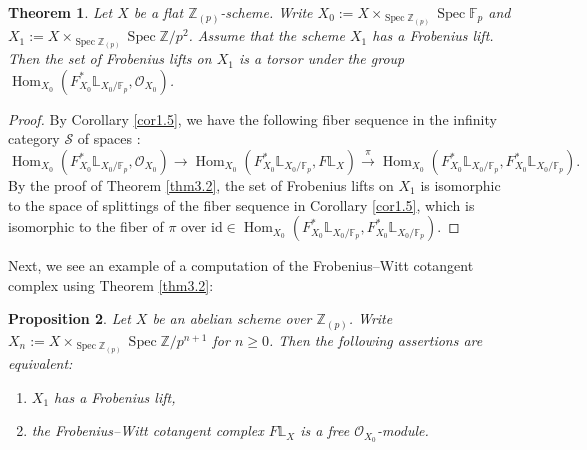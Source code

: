 \documentclass[11pt, a4paper]{amsart}
\theoremstyle{plain}
\newtheorem{theorem}{Theorem}[section]
\newtheorem{prop}[theorem]{Proposition}
\theoremstyle{definition}
\begin{document}
\begin{theorem}\label{thm3.3}
    Let $X$ be a flat $\mathbb Z_{(p)}$-scheme. Write $X_0:=X\times _{\operatorname{Spec}\mathbb Z_{(p)}}\operatorname{Spec}\mathbb F_p$ and  $X_1:=X\times _{\operatorname{Spec}\mathbb Z_{(p)}}\operatorname{Spec}\mathbb Z/p^2$. Assume that the scheme $X_1$ has a Frobenius lift. Then the set of Frobenius lifts on $X_1$ is a torsor under the group $\operatorname{Hom}_{X_0}(F_{X_0}^*\mathbb L_{X_0/\mathbb F_p},\mathcal O_{X_0})$.
\end{theorem}
\begin{proof}
    By Corollary \ref{cor1.5}, we have the following fiber sequence in the infinity category $\mathcal S$ of spaces :\[\operatorname{Hom}_{X_0}(F_{X_0}^*\mathbb L_{X_0/\mathbb F_p},\mathcal O_{X_0})\to \operatorname{Hom}_{X_0}(F_{X_0}^*\mathbb L_{X_0/\mathbb F_p},F\mathbb L_{X})\xrightarrow[]{\pi} \operatorname{Hom}_{X_0}(F_{X_0}^*\mathbb L_{X_0/\mathbb F_p},F_{X_0}^*\mathbb L_{X_0/\mathbb F_p}).\] By the proof of Theorem \ref{thm3.2}, the set of Frobenius lifts on $X_1$ is isomorphic to the space of splittings of the fiber sequence in Corollary \ref{cor1.5}, which is isomorphic to the fiber of $\pi$ over $\mathrm{id}\in \operatorname{Hom}_{X_0}(F_{X_0}^*\mathbb L_{X_0/\mathbb F_p},F_{X_0}^*\mathbb L_{X_0/\mathbb F_p})$.
\end{proof}
Next, we see an example of a computation of the Frobenius--Witt cotangent complex using Theorem \ref{thm3.2}:
\begin{prop}
    Let $X$ be an abelian scheme over $\mathbb Z_{(p)}$. Write $X_n:=X\times_{\operatorname{Spec}\mathbb Z_{(p)}}\operatorname{Spec}\mathbb Z/p^{n+1}$ for $n\ge0$. Then the following assertions are equivalent:\begin{enumerate}
        \item $X_1$ has a Frobenius lift,
        \item the Frobenius--Witt cotangent complex $F\mathbb L_X$ is a free $\mathcal O_{X_0}$-module.
    \end{enumerate}
\end{prop}
\end{document}
